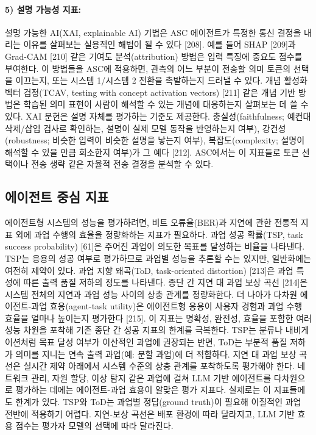 \paragraph{5) 설명 가능성 지표:}
설명 가능한 AI(XAI, explainable AI) 기법은 ASC 에이전트가 특정한 통신 결정을 내리는 이유를 살펴보는 실용적인 해법이 될 수 있다 [208]. 예를 들어 SHAP [209]과 Grad-CAM [210] 같은 기여도 분석(attribution) 방법은 입력 특징에 중요도 점수를 부여한다. 이 방법들을 ASC에 적용하면, 관측의 어느 부분이 전송할 의미 토큰의 선택을 이끄는지, 또는 시스템 1/시스템 2 전환을 촉발하는지 드러낼 수 있다. 개념 활성화 벡터 검정(TCAV, testing with concept activation vectors) [211] 같은 개념 기반 방법은 학습된 의미 표현이 사람이 해석할 수 있는 개념에 대응하는지 살펴보는 데 쓸 수 있다. XAI 문헌은 설명 자체를 평가하는 기준도 제공한다. 충실성(faithfulness; 예컨대 삭제/삽입 검사로 확인하는, 설명이 실제 모델 동작을 반영하는지 여부), 강건성(robustness; 비슷한 입력이 비슷한 설명을 낳는지 여부), 복잡도(complexity; 설명이 해석할 수 있을 만큼 희소한지 여부)가 그 예다 [212]. ASC에서는 이 지표들로 토큰 선택이나 전송 생략 같은 자율적 전송 결정을 분석할 수 있다.

\subsection{에이전트 중심 지표}

에이전트형 시스템의 성능을 평가하려면, 비트 오류율(BER)과 지연에 관한 전통적 지표 외에 과업 수행의 효율을 정량화하는 지표가 필요하다. 과업 성공 확률(TSP, task success probability) [61]은 주어진 과업이 의도한 목표를 달성하는 비율을 나타낸다. TSP는 응용의 성공 여부로 평가하므로 과업별 성능을 추론할 수는 있지만, 일반화에는 여전히 제약이 있다. 과업 지향 왜곡(ToD, task-oriented distortion) [213]은 과업 특성에 따른 출력 품질 저하의 정도를 나타낸다. 종단 간 지연 대 과업 보상 곡선 [214]은 시스템 전체의 지연과 과업 성능 사이의 상충 관계를 정량화한다. 더 나아가 다차원 에이전트-과업 효용(agent-task utility)은 에이전트형 응용이 사용자 경험과 과업 수행 효율을 얼마나 높이는지 평가한다 [215]. 이 지표는 명확성, 완전성, 효율을 포함한 여러 성능 차원을 포착해 기존 종단 간 성공 지표의 한계를 극복한다. TSP는 분류나 내비게이션처럼 목표 달성 여부가 이산적인 과업에 권장되는 반면, ToD는 부분적 품질 저하가 의미를 지니는 연속 출력 과업(예: 분할 과업)에 더 적합하다. 지연 대 과업 보상 곡선은 실시간 제약 아래에서 시스템 수준의 상충 관계를 포착하도록 평가해야 한다. 네트워크 관리, 자원 할당, 이상 탐지 같은 과업에 걸쳐 LLM 기반 에이전트를 다차원으로 평가하는 데에는 에이전트-과업 효용이 알맞은 평가 지표다. 실제로는 이 지표들에도 한계가 있다. TSP와 ToD는 과업별 정답(ground truth)이 필요해 이질적인 과업 전반에 적용하기 어렵다. 지연-보상 곡선은 배포 환경에 따라 달라지고, LLM 기반 효용 점수는 평가자 모델의 선택에 따라 달라진다.

